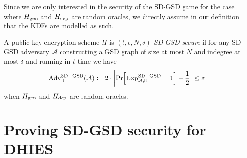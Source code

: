 Since we are only interested in the security of the SD-GSD game for the case where $H_\mathrm{gen}$ and $H_\mathrm{dep}$ are random oracles, we directly assume in our definition that the KDFs are modelled as such.

\begin{definition}

	A public key encryption scheme $\Pi$ is \emph{$(t, \epsilon, N, \delta)$-SD-GSD secure} if for any SD-GSD adversary $\mathcal{A}$ constructing a GSD graph of size at most $N$ and indegree at most $\delta$ and running in $t$ time we have
	\begin{align*}
		\mathrm{Adv}_{\Pi}^{\mathrm{SD-GSD}}(\mathcal{A}) \coloneqq 2 \cdot \abs*{\pr{\mathrm{Exp}_{\mathcal{A}, \Pi}^{\mathrm{SD-GSD}} = 1} - \frac{1}{2}} \le \epsilon
	\end{align*}
	when $H_\mathrm{gen}$ and $H_\mathrm{dep}$ are random oracles.

\end{definition}

\section{Proving SD-GSD security for DHIES}

